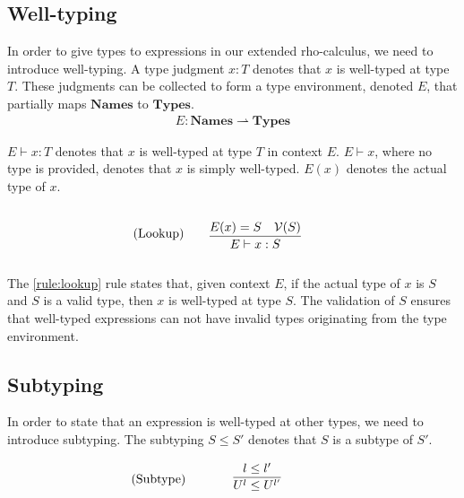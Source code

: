 \subsection{Well-typing}
In order to give types to expressions in our extended rho-calculus, we need to introduce well-typing.
A type judgment $x:T$ denotes that $x$ is well-typed at type $T$.
These judgments can be collected to form a type environment, denoted $E$, that partially maps $\mathbf{Names}$ to $\mathbf{Types}$.
\begin{align*}
    E: \mathbf{Names} \rightharpoonup \mathbf{Types}
\end{align*}

\noindent $E\vdash x:T$ denotes that $x$ is well-typed at type $T$ in context $E$.
$E\vdash x$, where no type is provided, denotes that $x$ is simply well-typed.
$E(x)$ denotes the actual type of $x$.

\begin{align*}
    \tag{Lookup}\label{rule:lookup} &\infrule{E(x)=S\quad\valid{S}}{E\vdash x:S}
\end{align*}

The \ref{rule:lookup} rule states that, given context $E$, if the actual type of $x$ is $S$ and $S$ is a valid type, then $x$ is well-typed at type $S$.
The validation of $S$ ensures that well-typed expressions can not have invalid types originating from the type environment.

\subsection{Subtyping}
In order to state that an expression is well-typed at other types, we need to introduce subtyping.
The subtyping $S\leq S'$ denotes that $S$ is a subtype of $S'$. 





\begin{align*}
    \tag{Subtype}\label{rule:subtype} &\infrule{l\leq l'}{U^l\leq U^{l'}}
\end{align*}

